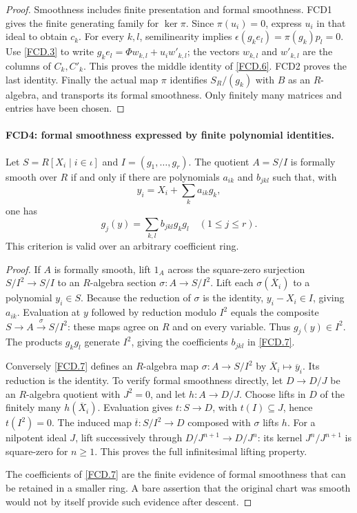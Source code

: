 \documentclass[11pt,a4paper]{article}
\numberwithin{equation}{section}
\theoremstyle{remark}\newtheorem{remark}[theorem]{Remark}
\begin{document}
\begin{proof}
Smoothness includes finite presentation and formal smoothness.
FCD1 gives the finite generating family for $\ker\pi$.
Since $\pi(u_i)=0$, express $u_i$ in that ideal to obtain $c_k$.
For every $k,l$, semilinearity implies
$\epsilon(g_ke_l)=\pi(g_k)p_l=0$.
Use \eqref{FCD.3} to write
$g_ke_l=\Phi w_{k,l}+u_iw'_{k,l}$; the vectors $w_{k,l}$ and
$w'_{k,l}$ are the columns of $C_k,C'_k$.  This proves the
middle identity of \eqref{FCD.6}.  FCD2 proves the last identity.
Finally the actual map $\pi$ identifies $S_R/(g_k)$ with $B$
as an $R$-algebra, and transports its formal smoothness.  Only
finitely many matrices and entries have been chosen.
\end{proof}

\paragraph{FCD4: formal smoothness expressed by finite polynomial identities.}
\label{claim:FCD4}
Let $S=R[X_i\mid i\in\iota]$ and $I=(g_1,\ldots,g_r)$.
The quotient $A=S/I$ is formally smooth over $R$ if and only if
there are polynomials $a_{ik}$ and $b_{jkl}$ such that, with
\[
 y_i=X_i+\sum_k a_{ik}g_k,
\]
one has
\[
 g_j(y)=\sum_{k,l}b_{jkl}g_kg_l\quad(1\le j\le r).   \tag{FCD.7}\label{FCD.7}
\]
This criterion is valid over an arbitrary coefficient ring.

\begin{proof}
If $A$ is formally smooth, lift $1_A$ across the square-zero
surjection $S/I^2\to S/I$ to an $R$-algebra section
$\sigma:A\to S/I^2$.  Lift each $\sigma(\overline X_i)$ to a
polynomial $y_i\in S$.  Because the reduction of $\sigma$ is the
identity, $y_i-X_i\in I$, giving $a_{ik}$.  Evaluation at $y$
followed by reduction modulo $I^2$ equals the composite
$S\to A\xrightarrow{\sigma}S/I^2$: these maps agree on $R$
and on every variable.  Thus $g_j(y)\in I^2$.
The products $g_kg_l$ generate $I^2$, giving the coefficients
$b_{jkl}$ in \eqref{FCD.7}.

Conversely \eqref{FCD.7} defines an $R$-algebra map
$\sigma:A\to S/I^2$ by $\overline X_i\mapsto\overline y_i$.
Its reduction is the identity.  To verify formal smoothness directly,
let $D\to D/J$ be an $R$-algebra quotient with $J^2=0$, and
let $h:A\to D/J$.  Choose lifts in $D$ of the finitely many
$h(\overline X_i)$.  Evaluation gives $t:S\to D$, with
$t(I)\subseteq J$, hence $t(I^2)=0$.  The induced map
$\overline t:S/I^2\to D$ composed with $\sigma$ lifts $h$.
For a nilpotent ideal $J$, lift successively through
$D/J^{n+1}\to D/J^n$: its kernel $J^n/J^{n+1}$ is square-zero
for $n\ge1$.  This proves the full infinitesimal lifting property.

The coefficients of \eqref{FCD.7} are the finite evidence of formal
smoothness that can be retained in a smaller ring.  A bare assertion
that the original chart was smooth would not by itself provide such
evidence after descent.
\end{proof}
\end{document}
